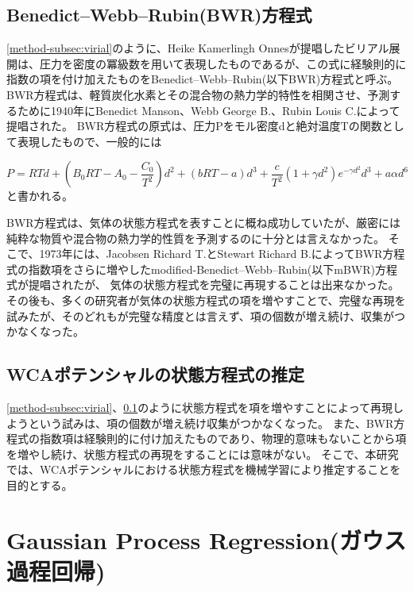 \documentclass[titlepage]{jsreport}
\begin{document}
\subsection{Benedict–Webb–Rubin(BWR)方程式}\label{method-subsec:BWR}
\ref{method-subsec:virial}のように、Heike Kamerlingh Onnesが提唱したビリアル展開は、圧力を密度の冪級数を用いて表現したものであるが、この式に経験則的に指数の項を付け加えたものをBenedict–Webb–Rubin(以下BWR)方程式と呼ぶ。
BWR方程式は、軽質炭化水素とその混合物の熱力学的特性を相関させ、予測するために1940年にBenedict Manson、Webb George B.、Rubin Louis C.によって提唱された\cite{BWR-equation:original}。
BWR方程式の原式は、圧力Pをモル密度dと絶対温度Tの関数として表現したもので、一般的には

\large
\begin{equation}
P=RTd+\left(B_0RT-A_0-{\frac{C_0}{T^2}}\right)d^2+(bRT-a)d^3+{\frac{c}{T^2}}(1+{\gamma}d^2)e^{-{\gamma}d^2}d^3+a{\alpha}d^6\label{eq:BWR}
\end{equation}
\normalsize
と書かれる。

BWR方程式は、気体の状態方程式を表すことに概ね成功していたが、厳密には純粋な物質や混合物の熱力学的性質を予測するのに十分とは言えなかった。
そこで、1973年には、Jacobsen Richard T.とStewart Richard B.によってBWR方程式の指数項をさらに増やしたmodified-Benedict–Webb–Rubin(以下mBWR)方程式が提唱\cite{m-BWR-equation}されたが、
気体の状態方程式を完璧に再現することは出来なかった。
その後も、多くの研究者が気体の状態方程式の項を増やすことで、完璧な再現を試みた\cite{MCCARTY1974276}\cite{BWR-equation:13}\cite{BWR-equation:25}が、そのどれもが完璧な精度とは言えず、項の個数が増え続け、収集がつかなくなった。

\subsection{WCAポテンシャルの状態方程式の推定}\label{method-subsec:WCA-equation}
\ref{method-subsec:virial}、\ref{method-subsec:BWR}のように状態方程式を項を増やすことによって再現しようという試みは、項の個数が増え続け収集がつかなくなった。
また、BWR方程式の指数項は経験則的に付け加えたものであり、物理的意味もないことから項を増やし続け、状態方程式の再現をすることには意味がない。
そこで、本研究では、WCAポテンシャルにおける状態方程式を機械学習により推定することを目的とする。

\section{Gaussian Process Regression(ガウス過程回帰)}\label{method-sec:Gauss}
\end{document}

